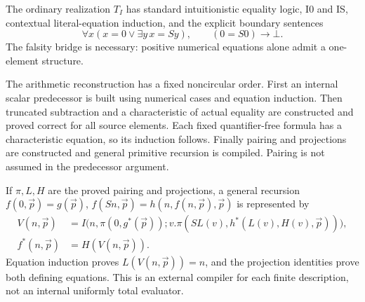 \documentclass[11pt,letterpaper]{article}
\theoremstyle{definition}\newtheorem{definition}[theorem]{Definition}
\theoremstyle{remark}\newtheorem{remark}[theorem]{Remark}
\begin{document}
The ordinary realization $T_I$ has standard intuitionistic equality
logic, I0 and IS, contextual literal-equation induction, and the explicit
boundary sentences
\[
 \forall x(x=0\vee\exists y\,x=Sy),\qquad (0=S0)\to\bot.
\]
The falsity bridge is necessary: positive numerical equations alone
admit a one-element structure.

The arithmetic reconstruction has a fixed noncircular order. First an
internal scalar predecessor is built using numerical cases and equation
induction. Then truncated subtraction and a characteristic of actual
equality are constructed and proved correct for all source elements.
Each fixed quantifier-free formula has a characteristic equation, so its
induction follows. Finally pairing and projections are constructed and
general primitive recursion is compiled. Pairing is not assumed in the
predecessor argument.

If $\pi,L,H$ are the proved pairing and projections, a general recursion
$f(0,\vec p)=g(\vec p)$, $f(Sn,\vec p)=h(n,f(n,\vec p),\vec p)$ is
represented by
\[
\begin{split}
 V(n,\vec p)&=I\bigl(n,\pi(0,g^*(\vec p));
 v.\pi(SL(v),h^*(L(v),H(v),\vec p))\bigr),\\
 f^*(n,\vec p)&=H(V(n,\vec p)).
\end{split}
\]
Equation induction proves $L(V(n,\vec p))=n$, and the projection
identities prove both defining equations. This is an external compiler
for each finite description, not an internal uniformly total evaluator.
\end{document}
